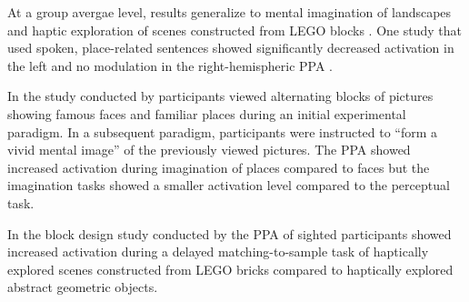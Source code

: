 \documentclass[english]{article}
\begin{document}
At a group avergae level, results generalize to mental imagination of landscapes
\citep{ocraven2000mental} and haptic exploration of scenes constructed from LEGO
blocks \citep{wolbers2011modality}. One study that used spoken, place-related
sentences showed significantly decreased activation in the left and no
modulation in the right-hemispheric PPA \citep{aziz2008modulation}.

In the study conducted by \citep{ocraven2000mental} participants viewed
alternating blocks of pictures showing famous faces and familiar places during
an initial experimental paradigm. In a subsequent paradigm, participants were
instructed to ``form a vivid mental image'' of the previously viewed pictures.
The PPA showed increased activation during imagination of places compared to
faces but the imagination tasks showed a smaller activation level compared to
the perceptual task.

In the block design study conducted by \citep{wolbers2011modality} the PPA of
sighted participants showed increased activation during a delayed
matching-to-sample task of haptically explored scenes constructed from LEGO
bricks compared to haptically explored abstract geometric objects.




\end{document}
